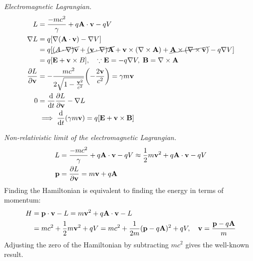 \documentclass{report}
\begin{document}
\begin{subquests}
	\item \emph{Electromagnetic Lagrangian.}
	\begin{align*}
		L & = \frac{-mc^2}{\gamma} + q{\vb A}\cdot{\vb v} - qV \\
		\nabla{L} & = q\bqty{\nabla\pqty{{\vb A}\cdot {\vb v}} - \nabla V} \\
		& = q\bqty{\cancel{\vb(A \cdot \nabla)\vb v} + \cancel{(\vb v \cdot \nabla)\vb A} + {\vb v \times (\nabla \times \vb A)} + \cancel{\vb A \times (\nabla \times \vb v)} - q\nabla V} \\
		& = q\bqty{\vb E + \vb v \times B},\quad\because {\vb E} = -q\nabla V, \; \vb B = \nabla \times \vb A\\
		\pdv{L}{\vb v} & = -\frac{mc^2}{2\sqrt{1- \frac{{\vb v}^2}{c^2}}}\pqty{-\frac{2\vb v}{c^2}} = \gamma m {\vb v} \\
		0 & = \dv{t}\pdv{L}{\vb v} - \nabla L \\
		& \implies \dv{t}(\gamma m \vb v) = q\bqty{\vb E + \vb v \times \vb B}
	\end{align*}

	\item \emph{Non-relativistic limit of the electromagnetic Lagrangian.}
	\begin{align*}
		L & = \frac{-mc^2}{\gamma} + q{\vb A}\cdot{\vb v} - qV \approx \frac{1}{2}m{\vb v}^2 + q{\vb A}\cdot{\vb v} - qV \\
		{\vb p} & = \pdv{L}{\vb v} = m{\vb v} + q{\vb A}
	\end{align*}
	Finding the Hamiltonian is equivalent to finding the energy in terms of momentum:
	\begin{align*}
		H & = {\vb p\cdot \vb v} - L = m{\vb v}^2 + q{\vb A \cdot \vb v} - L \\ 
		& = mc^2 + \frac{1}{2}m{\vb v}^2 + qV = mc^2 + \frac{1}{2m}({\vb p} - q{\vb A})^2 + qV, \quad {\vb v} = \frac{{\vb p} - q{\vb A}}{m}
	\end{align*}
	Adjusting the zero of the Hamiltonian by subtracting $mc^2$ gives the well-known result.


\end{subquests}
\end{document}
